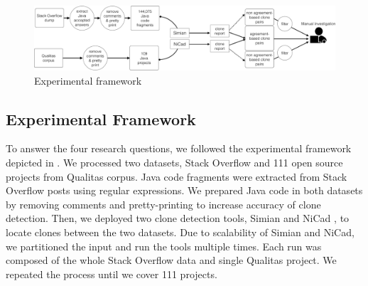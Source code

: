\documentclass{sig-alternate-05-2015}
\begin{document}
\begin{figure}
	\centering
	\includegraphics[width=0.8\linewidth]{exp_framework}
	\caption{Experimental framework}
	\label{fig:exp_framework}
\end{figure}

\subsection{Experimental Framework}
To answer the four research questions, we followed the experimental framework depicted in . We processed two datasets, Stack Overflow and 111 open source projects from Qualitas corpus. Java code fragments were extracted from Stack Overflow posts using regular expressions. We prepared Java code in both datasets by removing comments and pretty-printing to increase accuracy of clone detection. Then, we deployed two clone detection tools, Simian \cite{simian} and NiCad \cite{Roy2008,Cordy}, to locate clones between the two datasets. Due to scalability of Simian and NiCad, we partitioned the input and run the tools multiple times. Each run was composed of the whole Stack Overflow data and single Qualitas project. We repeated the process until we cover 111 projects. 
\end{document}
